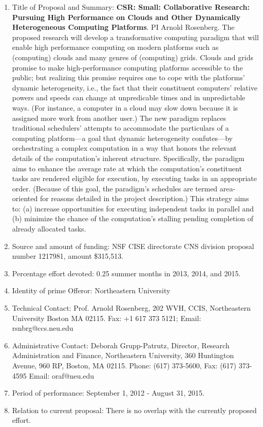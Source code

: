 \begin{enumerate}
\item Title of Proposal and Summary: {\bf CSR: Small: Collaborative
  Research: Pursuing High Performance on Clouds and Other Dynamically
  Heterogeneous Computing Platforms}. PI Arnold Rosenberg.  The
  proposed research will develop a transformative computing paradigm
  that will enable high performance computing on modern platforms such
  as (computing) clouds and many genres of (computing) grids. Clouds
  and grids promise to make high-performance computing platforms
  accessible to the public; but realizing this promise requires one to
  cope with the platforms’ dynamic heterogeneity, i.e., the fact that
  their constituent computers’ relative powers and speeds can change
  at unpredicable times and in unpredictable ways. (For instance, a
  computer in a cloud may slow down because it is assigned more work
  from another user.) The new paradigm replaces traditional
  schedulers’ attempts to accommodate the particulars of a computing
  platform—a goal that dynamic heterogeneity confutes—by orchestrating
  a complex computation in a way that honors the relevant details of
  the computation’s inherent structure. Specifically, the paradigm
  aims to enhance the average rate at which the computation’s
  constituent tasks are rendered eligible for execution, by executing
  tasks in an appropriate order. (Because of this goal, the paradigm’s
  schedules are termed area-oriented for reasons detailed in the
  project description.) This strategy aims to: (a) increase
  opportunities for executing independent tasks in parallel and (b)
  minimize the chance of the computation’s stalling pending completion
  of already allocated tasks.
\item Source and amount of funding: NSF CISE directorate CNS division
  proposal number 1217981, amount \$315,513.
\item Percentage effort devoted: 0.25 summer months in 2013, 2014, and 2015.
\item Identity of prime Offeror: Northeastern University
\item Technical Contact: Prof. Arnold Rosenberg,  202 WVH, CCIS, Northeastern University
Boston MA 02115. Fax: +1 617 373 5121;  Email: rsnbrg@ccs.neu.edu 
\item Administrative Contact: Deborah Grupp-Patrutz, Director,
  Research Administration and Finance, Northeastern University, 360
  Huntington Avenue, 960 RP, Boston, MA 02115. Phone: (617) 373-5600,
  Fax: (617) 373-4595 Email: oraf@neu.edu
\item  Period of performance: September 1, 2012 - August 31, 2015.
\item Relation to current proposal: There is no overlap with the currently proposed effort.
\end{enumerate}

